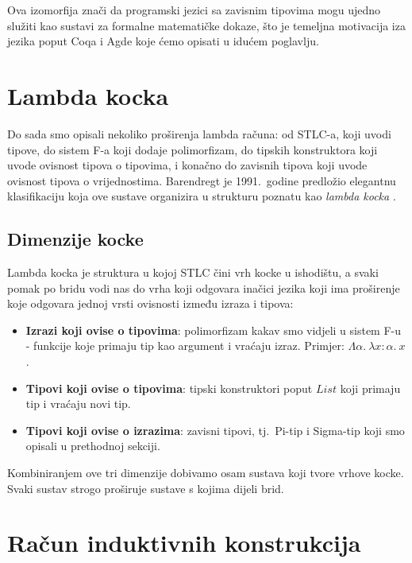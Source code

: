 \documentclass[diplomskirad,upload]{fer}
\begin{document}
Ova izomorfija znači da programski jezici sa zavisnim tipovima mogu ujedno
služiti kao sustavi za formalne matematičke dokaze, što je temeljna motivacija
iza jezika poput Coqa i Agde koje ćemo opisati u idućem poglavlju.

\section{Lambda kocka}

Do sada smo opisali nekoliko proširenja lambda računa: od STLC-a, koji
uvodi tipove, do sistem F-a koji dodaje polimorfizam, do tipskih konstruktora koji
uvode ovisnost tipova o tipovima, i konačno do zavisnih tipova koji uvode
ovisnost tipova o vrijednostima. Barendregt je 1991.\ godine predložio elegantnu
klasifikaciju koja ove sustave organizira u strukturu poznatu kao
\emph{lambda kocka}  \cite{Barendregt_1991}.

\subsection{Dimenzije kocke}

Lambda kocka je struktura u kojoj STLC čini vrh kocke u ishodištu, a svaki
pomak po bridu vodi nas do vrha koji odgovara inačici jezika koji ima proširenje
koje odgovara jednoj vrsti ovisnosti između izraza i tipova:

\begin{itemize}
    \item \textbf{Izrazi koji ovise o tipovima}: polimorfizam kakav smo vidjeli
    u sistem F-u - funkcije koje primaju tip kao argument i vraćaju izraz.
    Primjer: \(\Lambda \alpha.\ \lambda x : \alpha.\ x\).

    \item \textbf{Tipovi koji ovise o tipovima}: tipski konstruktori poput
    \(List\) koji primaju tip i vraćaju novi tip.

    \item \textbf{Tipovi koji ovise o izrazima}: zavisni tipovi, tj.\ Pi-tip i
    Sigma-tip koji smo opisali u prethodnoj sekciji.
\end{itemize}

Kombiniranjem ove tri dimenzije dobivamo osam sustava koji tvore vrhove kocke.
Svaki sustav strogo proširuje sustave s kojima dijeli brid.

\section{Račun induktivnih konstrukcija}
\label{sec:cic}
\end{document}
